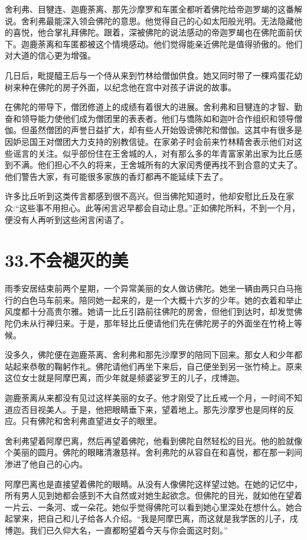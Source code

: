 \documentclass[12pt,twoside,openany]{book}
\begin{document}
舍利弗、目犍连、迦鹿荼离、那先沙摩罗和车匿全都听着佛陀给帝迦罗朅的这番解说。舍利弗最能深入领会佛陀的意思。他觉得自己的心如太阳般光明。无法隐藏他的喜悦，他合掌礼拜佛陀。跟着，深被佛陀的说法感动的帝迦罗朅也在佛陀面前伏下。迦鹿荼离和车匿都被这个情境感动。他们觉得能亲近佛陀是值得骄傲的。他们对大道的信心更为增强。

几日后，毗提醯王后与一个侍从来到竹林给僧伽供食。她又同时带了一棵鸡蛋花幼树来种在佛陀的房子外面，以纪念他在宫中对孩子讲说的故事。

在佛陀的带导下，僧团修道上的成绩有着很大的进展。舍利弗和目犍连的才智、勤奋和领导能力使他们成为僧团里的表表者。他们与憍陈如和迦叶合作组织和领导僧伽。但虽然僧团的声誉日益扩大，却有些人开始毁谤佛陀和僧伽。这其中有很多是因妒忌国王对僧团大力支持的别教信徒。在家弟子时会前来竹林精舍表示他们对这些谣言的关注。似乎部份住在王舍城的人，对有那么多的年青富家弟出家为比丘感到不满。他们担心不久的将来，王舍城所有的大家闰秀便再找不到合意的丈夫了。他们警告大家，有可能很多家族的香灯都再不能延续下去了。

许多比丘听到这类传言都感到很不高兴。但当佛陀知道时，他却安慰比丘及在家众:“这些事不用担心。此等闲言迟早都会自动止息。”正如佛陀所料，不到一个月，便没有人再听到这些闲言闲语了。


\chapter{33.不会褪灭的美}\label{ch33}

雨季安居结束前两个星期，一个异常美丽的女人做访佛陀。她坐一辆由两只白马拖行的白色马车前来。陪同她一起来的，是一个大概十六岁的少年。她的衣着和举止风度都十分高贵尔雅。她请一比丘引路前往佛陀的房舍，但他们到达时，却发觉佛陀仍未从行禅归来。于是，那年轻比丘便请他们先在佛陀房子的外面坐在竹椅上等候。

没多久，佛陀便在迦鹿茶离、舍利弗和那先沙摩罗的陪同下回来。那女人和少年都站起来恭敬的鞠躬作礼。佛陀请他们再坐下来后，自己便坐到另一张竹椅上。原来这位女士就是阿摩巴离，而少年就是频婆娑罗王的儿子，戌博迦。

迦鹿荼离从来都没有见过这样美丽的女子。他才刚受了比丘戒一个月，一时间不知道应否目视美人。于是，他把眼睛垂下来，望着地上。那先沙摩罗也是同样的反应。只有佛陀和舍利弗直望进女子的眼里。

舍利弗望着阿摩巴离，然后再望着佛陀，他看到佛陀自然轻松的目光。他的脸就像个美丽的圆月。佛陀的眼睹清澈慈祥。舍利弗陀的从容自在和喜悦，都在那一刹间渗进了他自己的心内。

阿摩巴离也是直接望着佛陀的眼睛。从没有人像佛陀这样望过她。在她的记忆中，所有男人见到她都会感到不大自然或对她生起欲念。但佛陀的目光，就如他在望着一片云、一条河、或一朵花。她似乎觉得佛陀可以看到她心里深处在想什么。她合起掌来，把自己和儿子给各人介绍。“我是阿摩巴离，而这就是我学医的儿子，戌博迦。我们已久仰大名，一直都盼望着今天与你会面这时刻。”
\end{document}
